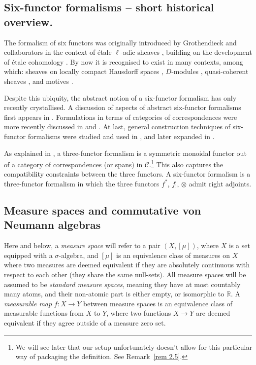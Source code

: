 \documentclass[10pt,a4paper,oneside]{amsart}
\theoremstyle{remark}
\theoremstyle{definition}
\begin{document}
\subsection{Six-functor formalisms -- short historical overview.}
The formalism of six functors was originally introduced by Grothendieck and collaborators in the context of \'etale $\ell$-adic sheaves \cite{Grothendieck1977}, building on the development of \'etale cohomology \cite{Deligne1976}. By now it is recognised to exist in many contexts, among which: sheaves on locally compact Hausdorff spaces \cite{Leray1950,Borel1957,Deligne1976,Iversen1986, Kashiwara1990,Volpe2021}, $D$-modules \cite{Bernstein2007,Scholze2022}, quasi-coherent sheaves \cite{Lipman2009}, and motives \cite{Ayoub2007,Cisinski2019}.

Despite this ubiquity, the abstract notion of a six-functor formalism has only recently crystallised. A discussion of aspects of abstract six-functor formalisms first appears in \cite{Fausk2003,Joshua2003}. Formulations in terms of categories of correspondences were more recently discussed in \cite{Hoermann2018} and \cite{Gaitsgory2017}.
At last, general construction techniques of six-functor formalisms were studied and used in \cite{Liu2012,Mann2022}, and later expanded in \cite{Scholze2022,Heyer2024}.

As explained in \cite{Scholze2022}, a three-functor formalism is a symmetric monoidal functor out of a category of correspondences (or spans) in $\mathcal{C}$.\footnote{We will see later that our setup unfortunately doesn't allow for this particular way of packaging the definition. See Remark~\ref{rem 2.5}.}
This also captures the compatibility constraints between the three functors.
A six-functor formalism is a three-functor formalism in which the three functors $f^*$, $f_!$, $\otimes$ admit right adjoints. 


\subsection{Measure spaces and commutative von Neumann algebras}

Here and below, a \emph{measure space} will refer to a pair $(X,[\mu])$, where $X$ is a set equipped with a $\sigma$-algebra, and $[\mu]$ is an equivalence class of measures on $X$ where two measures are deemed equivalent if they are absolutely continuous with respect to each other (they share the same null-sets).
All measure spaces will be assumed to be 
\emph{standard measure spaces}, meaning they have at most countably many atoms, and their non-atomic part is either empty, or isomorphic to $\mathbb{R}$.
A \emph{measurable map} $f:X\to Y$ between measure spaces is an equivalence class of measurable functions from $X$ to $Y$, where two functions $X\to Y$ are deemed equivalent if they agree outside of a measure zero set.
\end{document}
